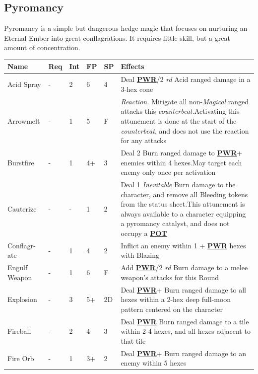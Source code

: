 \documentclass[12pt]{article}
\newcommand{\refto}[1]{\hyperlink{#1}{\textbf{#1}}}
\newcommand{\reftoit}[1]{\hyperlink{#1}{\emph{#1}}}
\begin{document}
\subsection{Pyromancy}
Pyromancy is a simple but dangerous hedge magic that focuses on nurturing an Eternal Ember into great conflagrations. It requires little skill, but a great amount of concentration.
\begin{center}
\begin{tabularx}{\textwidth}{p{}p{}p{}p{}p{}p{}}
\hline
\rowcolor{white} \textbf{Name} & \textbf{Req} & \textbf{Int} & \textbf{FP} & \textbf{SP} & \textbf{Effects}\setcounter{rownum}{0}\\
\hline
Acid Spray & - & 2 & 6 & 4 & Deal \refto{PWR}/2 \emph{rd} Acid ranged damage in a 3-hex cone\\ 
Arrowmelt & - & 1 & 5 & F & \emph{Reaction.} Mitigate all non-\emph{Magical} ranged attacks this \emph{counterbeat.}\newline Activating this attunement is done at the start of the \emph{counterbeat}, and does not use the reaction for any attacks\\
Burstfire & - & 1 & 4+ & 3 & Deal 2 Burn ranged damage to \refto{PWR}+ enemies within 4 hexes.\newline May target each enemy only once per activation \\
Cauterize & - & - & 1 & 2 & Deal 1 \reftoit{Inevitable} Burn damage to the character, and remove all Bleeding tokens from the status sheet.\newline This attunement is always available to a character equipping a pyromancy catalyst, and does not occupy a \refto{POT} \\
Conflagr-\newline ate & - & 1 & 4 & 2 & Inflict an enemy within 1 + \refto{PWR} hexes with Blazing\\
Engulf Weapon & - & 1 & 6 & F & Add \refto{PWR}/2 \emph{rd} Burn damage to a melee weapon’s attacks for this Round \\
Explosion & - & 3 & 5+ & 2D & Deal \refto{PWR}+ Burn ranged damage to all hexes within a 2-hex deep full-moon pattern centered on the character \\
Fireball & - & 2 & 4 & 3 & Deal \refto{PWR} Burn ranged damage to a tile within 2-4 hexes, and all hexes adjacent to that tile\\
Fire Orb & - & 1 & 3+ & 2 & Deal \refto{PWR}+ Burn ranged damage to an enemy within 5 hexes \\

\end{tabularx}
\end{center}
\end{document}
